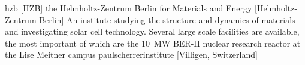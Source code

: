 \newglsXinstitution%
{hzb}%
[HZB]%
{the Helmholtz-Zentrum Berlin for Materials and Energy}%
[Helmholtz-Zentrum Berlin]%
{An institute studying the structure and dynamics of materials and investigating solar cell technology. Several large scale facilities are available, the most important of which are the \SI{10}{\mega\watt} BER-II nuclear research reactor at the Lise Meitner campus \cite{website:Helmholtz_Zentrum_Berlin}}%
{paulscherrerinstitute}%
[Villigen, Switzerland]%